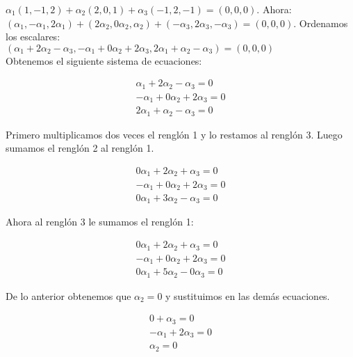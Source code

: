 \documentclass[letterpaper]{article}
\renewcommand{\*}{\cdot}
\theoremstyle{definition}
\begin{document}
$\alpha_{1}(1,-1,2)+\alpha_{2}(2,0,1)+ \alpha_{3}(-1,2,-1)=(0,0,0)$.
Ahora:\\

$(\alpha_{1},-\alpha_{1},2\alpha_{1})+(2\alpha_{2},0\alpha_{2},\alpha_{2})+ (-\alpha_{3},2\alpha_{3},-\alpha_{3})=(0,0,0)$. Ordenamos los escalares:\\

$(\alpha_{1}+2\alpha_{2}-\alpha_{3}, -\alpha_{1}+0\alpha_{2}+2\alpha_{3}, 2\alpha_{1}+\alpha_{2}-\alpha_{3})= (0,0,0)$\\

Obtenemos el siguiente sistema de ecuaciones:
\begin{center}
	\begin{align*}
	\alpha_{1}+2\alpha_{2}-\alpha_{3}=0\\
	-\alpha_{1}+0\alpha_{2}+2\alpha_{3}=0\\
	2\alpha_{1}+\alpha_{2}-\alpha_{3}=0
	\end{align*}
\end{center}

Primero multiplicamos dos veces el renglón 1 y lo restamos al renglón 3. Luego sumamos el renglón 2 al renglón 1.
\begin{center}
	\begin{align*}
	0\alpha_{1}+2\alpha_{2}+\alpha_{3}=0\\
	-\alpha_{1}+0\alpha_{2}+2\alpha_{3}=0\\
	0\alpha_{1}+3\alpha_{2}-\alpha_{3}=0
	\end{align*}
\end{center}

Ahora al renglón 3 le sumamos el renglón 1:

\begin{center}
	\begin{align*}
	0\alpha_{1}+2\alpha_{2}+\alpha_{3}=0\\
	-\alpha_{1}+0\alpha_{2}+2\alpha_{3}=0\\
	0\alpha_{1}+5\alpha_{2}-0\alpha_{3}=0
	\end{align*}
\end{center}

De lo anterior obtenemos que $\alpha_{2}= 0$ y sustituimos en las demás ecuaciones.

\begin{center}
	\begin{align*}
	0+\alpha_{3}=0\\
	-\alpha_{1}+2\alpha_{3}=0\\
	\alpha_{2}=0
	\end{align*}
\end{center}
\end{document}
